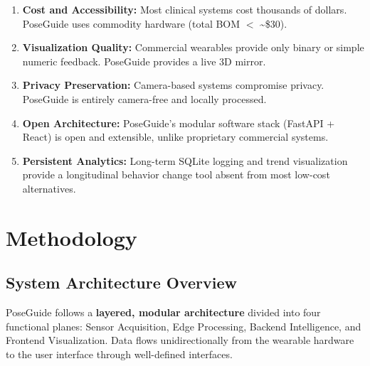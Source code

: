 \documentclass[12pt,a4paper]{report}
\begin{document}
\begin{enumerate}[leftmargin=2em, label=\arabic*.]
    \item \textbf{Cost and Accessibility:} Most clinical systems cost thousands of dollars. PoseGuide uses commodity hardware (total BOM $<$ \textasciitilde\$30).
    \item \textbf{Visualization Quality:} Commercial wearables provide only binary or simple numeric feedback. PoseGuide provides a live 3D mirror.
    \item \textbf{Privacy Preservation:} Camera-based systems compromise privacy. PoseGuide is entirely camera-free and locally processed.
    \item \textbf{Open Architecture:} PoseGuide's modular software stack (FastAPI + React) is open and extensible, unlike proprietary commercial systems.
    \item \textbf{Persistent Analytics:} Long-term SQLite logging and trend visualization provide a longitudinal behavior change tool absent from most low-cost alternatives.
\end{enumerate}


\chapter{Methodology}

\section{System Architecture Overview}

PoseGuide follows a \textbf{layered, modular architecture} divided into four functional planes: Sensor Acquisition, Edge Processing, Backend Intelligence, and Frontend Visualization. Data flows unidirectionally from the wearable hardware to the user interface through well-defined interfaces.
\end{document}
